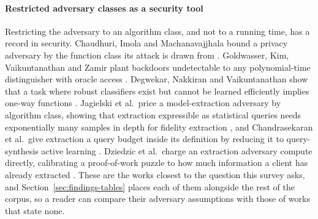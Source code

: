 \paragraph{Restricted adversary classes as a security tool}
Restricting the adversary to an algorithm class, and not to a running time, has
a record in security. Chaudhuri, Imola and Machanavajjhala bound a privacy
adversary by the function class its attack is drawn from \cite{CIM19}.
Goldwasser, Kim, Vaikuntanathan and Zamir plant backdoors undetectable to any
polynomial-time distinguisher with oracle access \cite{GKVZ22}. Degwekar,
Nakkiran and Vaikuntanathan show that a task where robust classifiers exist but
cannot be learned efficiently implies one-way functions \cite{DNV19}. Jagielski
et al.\ price a model-extraction adversary by algorithm class, showing that
extraction expressible as statistical queries needs exponentially many samples
in depth for fidelity extraction \cite{JCBKP20}, and Chandrasekaran et al.\ give
extraction a query budget inside its definition by reducing it to
query-synthesis active learning \cite{CCGJY20}. Dziedzic et al.\ charge an
extraction adversary compute directly, calibrating a proof-of-work puzzle to how
much information a client has already extracted \cite{DKLP22}. These are the
works closest to the question this survey asks, and
Section~\ref{sec:findings-tables} places each of them alongside the rest of the
corpus, so a reader can compare their adversary assumptions with those of works
that state none.
